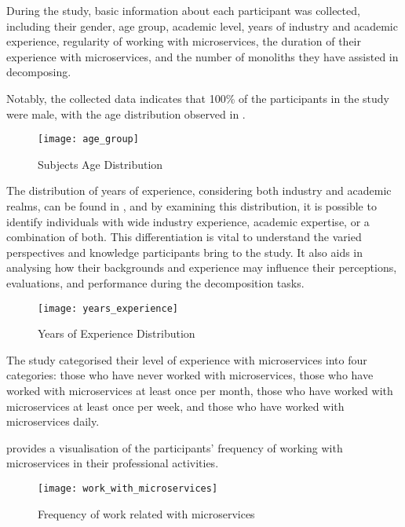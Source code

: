 During the study, basic information about each participant was collected,
including their gender, age group, academic level, years of industry and
academic experience, regularity of working with microservices, the duration of
their experience with microservices, and the number of monoliths they have
assisted in decomposing.

Notably, the collected data indicates that 100\% of the participants in the
study were male, with the age distribution observed in
.

\begin{figure*}[!htb]
  \centering
  \texttt{[image: age\_group]}
  \caption{Subjects Age Distribution}
  \label{fig:subjects_age_distribution}
\end{figure*}

The distribution of years of experience, considering both industry and academic
realms, can be found in , and by
examining this distribution, it is possible to identify individuals with
wide industry experience, academic expertise, or a combination of both. This
differentiation is vital to understand the varied perspectives and knowledge
participants bring to the study. It also aids in analysing how their
backgrounds and experience may influence their perceptions, evaluations, and
performance during the decomposition tasks.

\begin{figure*}[!htb]
  \centering
  \texttt{[image: years\_experience]}
  \caption{Years of Experience Distribution}
  \label{fig:year_experience_distribution}
\end{figure*}

The study categorised their level of experience with microservices into four
categories: those who have never worked with microservices, those who have
worked with microservices at least once per month, those who have worked with
microservices at least once per week, and those who have worked with
microservices daily.

 provides a visualisation of the
participants' frequency of working with microservices in their professional
activities.

\begin{figure*}[!htb]
  \centering
  \texttt{[image: work\_with\_microservices]}
  \caption{Frequency of work related with microservices}
  \label{fig:work_with_microservices}
\end{figure*}

